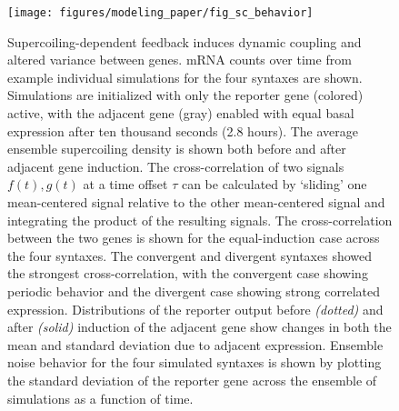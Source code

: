 \documentclass[11pt]{article} %
\begin{document}
\begin{figure}[htbp]
    \centering
    {\texttt{[image: figures/modeling\_paper/fig\_sc\_behavior]}
    \label{fig:sc_examples}
    \label{fig:sc_density}
    \label{fig:cross_correlation_cartoon}
    \label{fig:orientation_cross_correlation}
    \label{fig:output_distribution_by_orientation_dynamics}
    \label{fig:noise_by_orientation}
    }
\end{figure}
\begin{figure}[htbp]
    \ContinuedFloat
    \caption{Supercoiling-dependent feedback induces dynamic coupling and altered variance between genes.
         mRNA counts over time from example individual simulations for the four syntaxes are shown. Simulations are initialized with only the reporter gene (colored) active, with the adjacent gene (gray) enabled with equal basal expression after ten thousand seconds (2.8 hours).
         The average ensemble supercoiling density is shown both before and after adjacent gene induction.
         The cross-correlation of two signals \(f(t), g(t)\) at a time offset \(\tau\) can be calculated by `sliding' one mean-centered signal relative to the other mean-centered signal and integrating the product of the resulting signals.
         The cross-correlation between the two genes is shown for the equal-induction case across the four syntaxes. The convergent and divergent syntaxes showed the strongest cross-correlation, with the convergent case showing periodic behavior and the divergent case showing strong correlated expression.
         Distributions of the reporter output before \textit{(dotted)} and after \textit{(solid)} induction of the adjacent gene show changes in both the mean and standard deviation due to adjacent expression.
         Ensemble noise behavior for the four simulated syntaxes is shown by plotting the standard deviation of the reporter gene across the ensemble of simulations as a function of time.
    }
    \label{fig:top:single_cell_behavior}
\end{figure}
\end{document}
